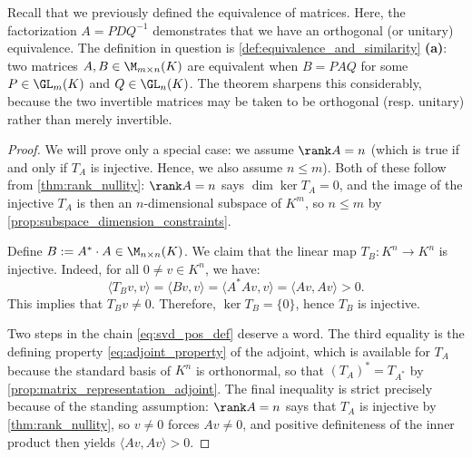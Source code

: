 \begin{remark}
Recall that we previously defined the equivalence of matrices. Here, the factorization $A = P D Q^{-1}$ demonstrates that we have an orthogonal (or unitary) equivalence.
The definition in question is \cref{def:equivalence_and_similarity} \textbf{(a)}: two matrices $A, B \in \M_{m \times n}(K)$ are equivalent when $B = PAQ$ for some $P \in \GL_m(K)$ and $Q \in \GL_n(K)$. The theorem sharpens this considerably, because the two invertible matrices may be taken to be orthogonal (resp. unitary) rather than merely invertible.
\end{remark}

\begin{proof}
We will prove only a special case: we assume $\rank A = n$ (which is true if and only if $T_A$ is injective. Hence, we also assume $n \le m$). Both of these follow from \cref{thm:rank_nullity}: $\rank A = n$ says $\dim \ker T_A = 0$, and the image of the injective $T_A$ is then an $n$-di\-men\-sional subspace of $K^m$, so $n \le m$ by \cref{prop:subspace_dimension_constraints}.

Define $B := A^* \cdot A \in \M_{n \times n}(K)$. We claim that the linear map $T_B \colon K^n \to K^n$ is injective.
Indeed, for all $0 \neq v \in K^n$, we have:
\begin{equation}
\label{eq:svd_pos_def}
\langle T_B v, v \rangle = \langle Bv, v \rangle = \langle A^* A v, v \rangle = \langle A v, A v \rangle > 0.
\end{equation}
This implies that $T_B v \neq 0$. Therefore, $\ker T_B = \{0\}$, hence $T_B$ is injective.

Two steps in the chain \eqref{eq:svd_pos_def} deserve a word. The third equality is the defining property \eqref{eq:adjoint_property} of the adjoint, which is available for $T_A$ because the standard basis of $K^n$ is orthonormal, so that $(T_A)^* = T_{A^*}$ by \cref{prop:matrix_representation_adjoint}. The final inequality is strict precisely because of the standing assumption: $\rank A = n$ says that $T_A$ is injective by \cref{thm:rank_nullity}, so $v \neq 0$ forces $Av \neq 0$, and positive definiteness of the inner product then yields $\langle Av, Av \rangle > 0$.


\end{proof}
